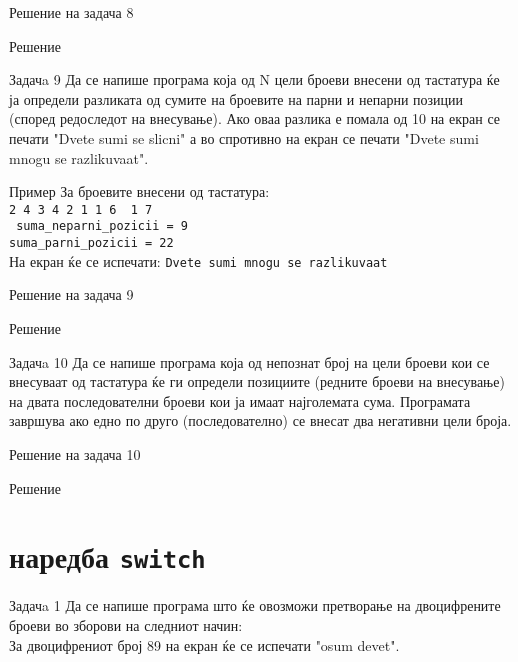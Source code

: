 \begin{frame}[fragile]{Решение на задача 8}
\begin{exampleblock}{Решение}

\end{exampleblock}
\end{frame}

\begin{frame}{Задачa 9}
Да се напише програма која од N цели броеви внесени од тастатура ќе ја определи 
разликата од сумите на броевите на парни и непарни позиции 
(според редоследот на внесување). Ако оваа разлика е помала од 10 на екран се печати 
"Dvete sumi se slicni" а во спротивно на екран се печати "Dvete sumi mnogu se
razlikuvaat".
\begin{exampleblock}{Пример}
За броевите внесени од тастатура:\\
\texttt{{\color{red}2} 4 {\color{red}3} 4 {\color{red}2} 1 {\color{red}1} 6
{\color{red} 1} 7}\\
\texttt{{\color{red} suma\_neparni\_pozicii = 9}}\\
\texttt{suma\_parni\_pozicii = 22}\\
На екран ќе се испечати: \texttt{Dvete sumi mnogu se razlikuvaat}
\end{exampleblock}
\end{frame}

\begin{frame}[fragile]{Решение на задача 9}
\begin{exampleblock}{Решение}

\end{exampleblock}
\end{frame}

\begin{frame}{Задачa 10}
Да се напише програма која од непознат број на цели броеви кои се внесуваат од тастатура 
ќе ги определи позициите (редните броеви на внесување) на двата последователни броеви кои 
ја имаат најголемата сума. Програмата завршува ако едно по друго (последователно) 
се внесат два негативни цели броја.
\end{frame}

\begin{frame}[fragile]{Решение на задача 10}
\begin{exampleblock}{Решение}

\end{exampleblock}
\end{frame}

\section{наредба \texttt{switch}}
\begin{frame}{Задачa 1}
Да се напише програма што ќе овозможи претворање на двоцифрените броеви во
зборови на следниот начин:\\
За двоцифрениот број 89 на екран ќе се испечати
"osum devet".
\end{frame}

